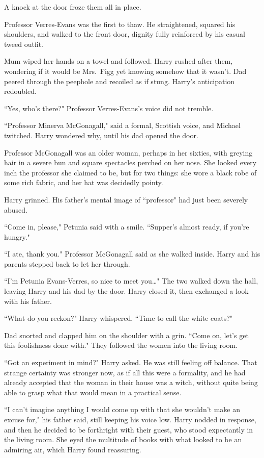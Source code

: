 A knock at the door froze them all in place.

Professor Verres-Evans was the first to thaw. He straightened, squared his shoulders, and walked to the front door, dignity fully reinforced by his casual tweed outfit.

Mum wiped her hands on a towel and followed. Harry rushed after them, wondering if it would be Mrs.~Figg yet knowing somehow that it wasn't. Dad peered through the peephole and recoiled as if stung. Harry's anticipation redoubled.

``Yes, who's there?" Professor Verres-Evans's voice did not tremble.

``Professor Minerva McGonagall," said a formal, Scottish voice, and Michael twitched. Harry wondered why, until his dad opened the door.

Professor McGonagall was an older woman, perhaps in her sixties, with greying hair in a severe bun and square spectacles perched on her nose. She looked every inch the professor she claimed to be, but for two things: she wore a black robe of some rich fabric, and her hat was decidedly pointy.

Harry grinned. His father's mental image of ``professor" had just been severely abused.

``Come in, please," Petunia said with a smile. ``Supper's almost ready, if you're hungry."

``I ate, thank you." Professor McGonagall said as she walked inside. Harry and his parents stepped back to let her through.

``I'm Petunia Evans-Verres, so nice to meet you{\ldots}" The two walked down the hall, leaving Harry and his dad by the door. Harry closed it, then exchanged a look with his father.

``What do you reckon?" Harry whispered. ``Time to call the white coats?"

Dad snorted and clapped him on the shoulder with a grin. ``Come on, let's get this foolishness done with." They followed the women into the living room.

``Got an experiment in mind?" Harry asked. He was still feeling off balance. That strange certainty was stronger now, as if all this were a formality, and he had already accepted that the woman in their house was a witch, without quite being able to grasp what that would mean in a practical sense.

``I can't imagine anything I would come up with that she wouldn't make an excuse for," his father said, still keeping his voice low. Harry nodded in response, and then he decided to be forthright with their guest, who stood expectantly in the living room. She eyed the multitude of books with what looked to be an admiring air, which Harry found reassuring.

